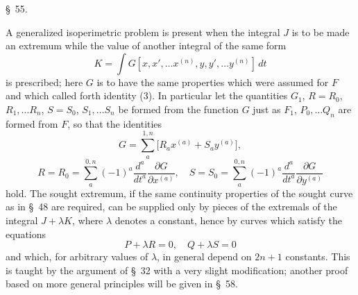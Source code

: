 \documentclass[11pt,a4paper,leqno]{article}
\begin{document}
\begin{center}
{\large \S~55.}
\end{center}

A generalized isoperimetric problem is present when the integral $J$ is to be made an extremum while the value of another integral of the same form
\[
K=\int G[x,x',\ldots x^{(n)},y,y',\ldots y^{(n)}]\,dt
\]
is prescribed; here $G$ is to have the same properties which were assumed for $F$ and which called forth identity (3). In particular let the quantities $G_1$, $R=R_0$, $R_1,\ldots R_n$, $S=S_0$, $S_1,\ldots S_n$ be formed from the function $G$ just as $F_1$, $P_0,\ldots Q_n$ are formed from $F$, so that the identities
\[
G=\sum_a^{1,n}\bigl[R_ax^{(a)}+S_ay^{(a)}\bigr],
\]
\[
R=R_0=\sum_a^{0,n}(-1)^a\frac{d^a}{dt^a}\frac{\partial G}{\partial x^{(a)}},
\quad
S=S_0=\sum_a^{0,n}(-1)^a\frac{d^a}{dt^a}\frac{\partial G}{\partial y^{(a)}}
\]
hold. The sought extremum, if the same continuity properties of the sought curve as in \S~48 are required, can be supplied only by pieces of the extremals of the integral $J+\lambda K$, where $\lambda$ denotes a constant, hence by curves which satisfy the equations
\[
P+\lambda R=0,\quad Q+\lambda S=0
\]
and which, for arbitrary values of $\lambda$, in general depend on $2n+1$ constants. This is taught by the argument of \S~32 with a very slight modification; another proof based on more general principles will be given in \S~58.
\end{document}
